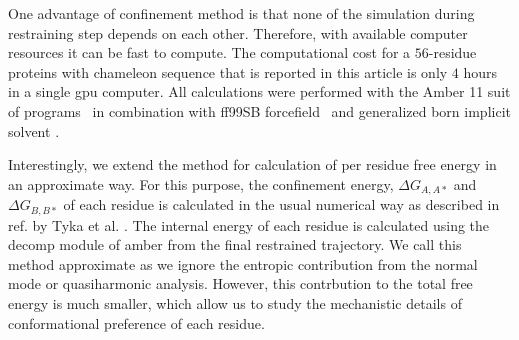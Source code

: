 \documentclass[12pt]{article}
\begin{document}
One advantage of confinement method is that
none of the simulation during restraining step depends on each other. Therefore, with available computer resources it can be fast 
to compute. The computational cost for a $56$-residue proteins with chameleon sequence that is reported in this article is only $4$ hours 
in a single gpu computer. All calculations were performed with the Amber 11 suit of programs~\cite{Case2012,Goetz2012} in combination with ff99SB
forcefield~\cite{Hornak2006} and generalized born implicit solvent \cite{Mongan2006}. 

Interestingly, we extend the
method for calculation of per residue free energy in an approximate way. For this purpose, the confinement energy,
$\Delta G_{A,A*}$ and $\Delta G_{B,B*}$ of each residue is calculated in the usual numerical way as described in ref. by
Tyka et al. \cite{Tyka2006}. The internal energy of each residue is calculated using the decomp module of amber from the
final restrained trajectory. We call this method approximate as we ignore the entropic contribution from the normal mode
or quasiharmonic analysis. However, this contrbution to the total free energy is much smaller, which allow us to study
the mechanistic details of conformational preference of each residue.  
\end{document}
